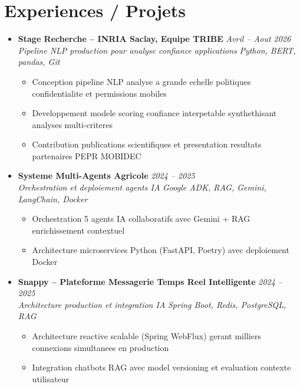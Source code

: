\documentclass[a4paper,11pt]{article}
\begin{document}
\section{Experiences / Projets}
\begin{itemize}[leftmargin=*, label={-}]

\item \textbf{Stage Recherche -- INRIA Saclay, Equipe TRIBE} \hfill \textit{Avril -- Aout 2026} \\
\textit{Pipeline NLP production pour analyse confiance applications} \hfill \textit{Python, BERT, pandas, Git}
\vspace{-2pt}
    \begin{itemize}[leftmargin=0.4cm, nosep, label=\tiny$\bullet$]
        \item \small{Conception pipeline NLP analyse a grande echelle politiques confidentialite et permissions mobiles}
        \item \small{Developpement modele scoring confiance interpetable synthethisant analyses multi-criteres}
        \item \small{Contribution publications scientifiques et presentation resultats partenaires PEPR MOBIDEC}
    \end{itemize}
\vspace{3pt}

\item \textbf{Systeme Multi-Agents Agricole} \hfill \textit{2024 -- 2025} \\
\textit{Orchestration et deploiement agents IA} \hfill \textit{Google ADK, RAG, Gemini, LangChain, Docker}
\vspace{-2pt}
    \begin{itemize}[leftmargin=0.4cm, nosep, label=\tiny$\bullet$]
        \item \small{Orchestration 5 agents IA collaboratifs avec Gemini + RAG enrichissement contextuel}
        \item \small{Architecture microservices Python (FastAPI, Poetry) avec deploiement Docker}
    \end{itemize}
\vspace{3pt}

\item \textbf{Snappy -- Plateforme Messagerie Temps Reel Intelligente} \hfill \textit{2024 -- 2025} \\
\textit{Architecture production et integration IA} \hfill \textit{Spring Boot, Redis, PostgreSQL, RAG}
\vspace{-2pt}
    \begin{itemize}[leftmargin=0.4cm, nosep, label=\tiny$\bullet$]
        \item \small{Architecture reactive scalable (Spring WebFlux) gerant milliers connexions simultanees en production}
        \item \small{Integration chatbots RAG avec model versioning et evaluation contexte utilisateur}
    \end{itemize}
\vspace{3pt}


\end{itemize}
\end{document}
